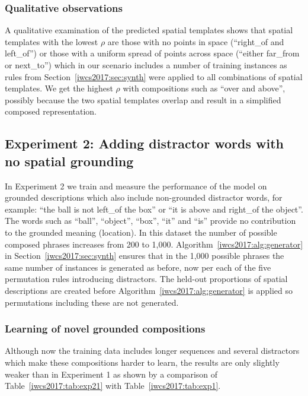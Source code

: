 \subsubsection{Qualitative observations}

A qualitative examination of the predicted spatial templates
shows that spatial templates with the lowest $\rho$ are those with no points in space
(``right\_of and left\_of'') or those with a uniform spread of points across space (``either
far\_from or next\_to'') which in our scenario includes a number of training
instances as rules from Section~\ref{iwcs2017:sec:synth} were applied to all combinations of spatial templates. We get the highest $\rho$ with compositions such as ``over and above'', possibly because the two spatial templates overlap and result in a simplified composed representation.

\subsection{Experiment 2: Adding distractor words with no spatial grounding}

In Experiment 2 we train and measure the performance of the model on grounded
descriptions which also include non-grounded distractor words, for
example: ``the ball is not left\_of the box'' or ``it is above
and right\_of the object''. The words such as ``ball'',
``object'', ``box'', ``it'' and ``is'' provide no
contribution to the grounded meaning (location). In this dataset the number of
possible composed phrases increases from 200 to 1,000. Algorithm~\ref{iwcs2017:alg:generator} in Section~\ref{iwcs2017:sec:synth} ensures that in the 1,000 possible
phrases the same number of instances is generated as before, now per each of the five permutation rules introducing distractors.
The held-out proportions of
spatial descriptions are created before Algorithm~\ref{iwcs2017:alg:generator} is applied so
permutations including these are not generated.

\subsubsection{Learning of novel grounded compositions}

Although now the training data includes longer sequences and several distractors which make these
compositions harder to learn, the results are only slightly weaker than in
Experiment 1 as shown by a comparison of Table~\ref{iwcs2017:tab:exp21} with Table~\ref{iwcs2017:tab:exp1}.

